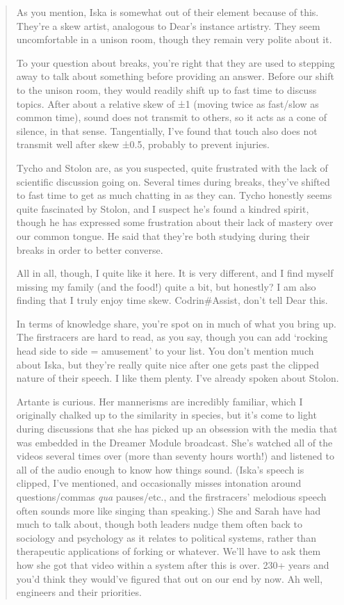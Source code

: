 \begin{quote}
As you mention, Iska is somewhat out of their element because of this. They're a skew artist, analogous to Dear's instance artistry. They seem uncomfortable in a unison room, though they remain very polite about it.

To your question about breaks, you're right that they are used to stepping away to talk about something before providing an answer. Before our shift to the unison room, they would readily shift up to fast time to discuss topics. After about a relative skew of ±1 (moving twice as fast/slow as common time), sound does not transmit to others, so it acts as a cone of silence, in that sense. Tangentially, I've found that touch also does not transmit well after skew ±0.5, probably to prevent injuries.

Tycho and Stolon are, as you suspected, quite frustrated with the lack of scientific discussion going on. Several times during breaks, they've shifted to fast time to get as much chatting in as they can. Tycho honestly seems quite fascinated by Stolon, and I suspect he's found a kindred spirit, though he has expressed some frustration about their lack of mastery over our common tongue. He said that they're both studying during their breaks in order to better converse.

All in all, though, I quite like it here. It is very different, and I find myself missing my family (and the food!) quite a bit, but honestly? I am also finding that I truly enjoy time skew. Codrin\#Assist, don't tell Dear this.

In terms of knowledge share, you're spot on in much of what you bring up. The firstracers are hard to read, as you say, though you can add `rocking head side to side = amusement' to your list. You don't mention much about Iska, but they're really quite nice after one gets past the clipped nature of their speech. I like them plenty. I've already spoken about Stolon.

Artante is curious. Her mannerisms are incredibly familiar, which I originally chalked up to the similarity in species, but it's come to light during discussions that she has picked up an obsession with the media that was embedded in the Dreamer Module broadcast. She's watched all of the videos several times over (more than seventy hours worth!) and listened to all of the audio enough to know how things sound. (Iska's speech is clipped, I've mentioned, and occasionally misses intonation around questions/commas \emph{qua} pauses/etc., and the firstracers' melodious speech often sounds more like singing than speaking.) She and Sarah have had much to talk about, though both leaders nudge them often back to sociology and psychology as it relates to political systems, rather than therapeutic applications of forking or whatever. We'll have to ask them how she got that video within a system after this is over. 230+ years and you'd think they would've figured that out on our end by now. Ah well, engineers and their priorities.


\end{quote}
